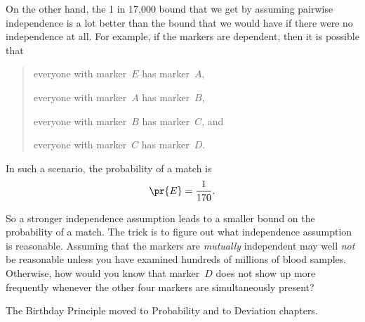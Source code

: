 On the other hand, the 1 in 17,000 bound that we get by assuming
pairwise independence is a lot better than the bound that we would
have if there were no independence at all.  For example, if the
markers are dependent, then it is possible that
\begin{quote}
everyone with marker~$E$ has marker~$A$,

everyone with marker~$A$ has marker~$B$,

everyone with marker~$B$ has marker~$C$, and

everyone with marker~$C$ has marker~$D$.
\end{quote}
In such a scenario, the probability of a match is
\begin{equation*}
    \pr{E} = \frac{1}{170}.
\end{equation*}

So a stronger independence assumption leads to a smaller bound on the
probability of a match.  The trick is to figure out what independence
assumption is reasonable.  Assuming that the markers are
\emph{mutually} independent may well \emph{not} be reasonable unless
you have examined hundreds of millions of blood samples.  Otherwise,
how would you know that marker~$D$ does not show up more frequently
whenever the other four markers are simultaneously present?

\begin{problems}
\practiceproblems
{}

\classproblems
{}

\begin{editingnotes}
The Birthday Principle %
moved to Probability and to Deviation chapters.
\end{editingnotes}


\examproblems
{}

\homeworkproblems
{}

\end{problems}

\endinput


